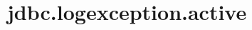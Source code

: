 \section{jdbc.logexception.active}
\label{configuration:JdbcLogexceptionActive}
\AvailableInJavaOnly{\TODO}